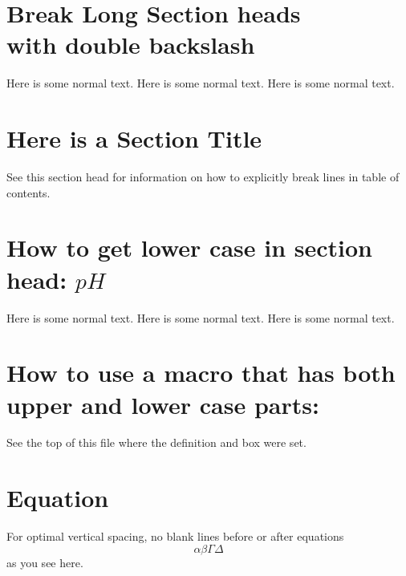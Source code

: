 \section[This Version of Section Head will be sent Contents]
{Break Long Section heads\\ with double backslash}
Here is some normal text.
Here is some normal text.
Here is some normal text.

 \section[This show how to explicitly break lines
\string\hfill\string\break\space in Table of Contents]
{Here is a Section Title}
See this section head for information on how to explicitly break lines in
table of contents.

\section{How to get \lowercase{lower case} in section head: \lowercase{$p$}$H$}
Here is some normal text.
Here is some normal text.
Here is some normal text.

\section{How to use a macro that has both upper and lower case parts:
\copy\sectsavebox}
See the top of this file where the definition and box were set.


\section{Equation}

For optimal vertical spacing, no blank lines before or after
equations
\begin{equation}
\alpha\beta\Gamma\Delta
\end{equation}
as you see here. 
